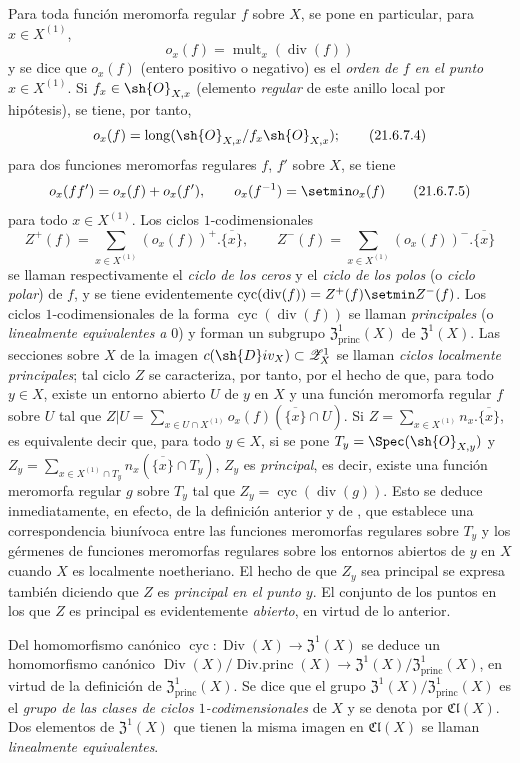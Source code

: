 \begin{env}[21.6.7]
Para toda función meromorfa regular $f$ sobre $X$, se pone en particular, para $x\in X^{(1)}$,
\[
\label{IV.21.6.7.3}
  o_x(f)=\operatorname{mult}_x(\operatorname{div}(f))
  \tag{21.6.7.3}
\]
y se dice que $o_x(f)$ (entero positivo o negativo) es el \emph{orden de $f$ en el punto} $x\in X^{(1)}$.
Si $f_x\in\sh{O}_{X,x}$ (elemento \emph{regular} de este anillo local por hipótesis), se tiene, por tanto,
\[
\label{IV.21.6.7.4}
  o_x(f)=\operatorname{long}(\sh{O}_{X,x}/f_x\sh{O}_{X,x});
  \tag{21.6.7.4}
\]
para dos funciones meromorfas regulares $f$, $f'$ sobre $X$, se tiene
\[
\label{IV.21.6.7.5}
  o_x(ff')=o_x(f)+o_x(f'),\qquad o_x(f^{-1})=\setmin o_x(f)
  \tag{21.6.7.5}
\]
para todo $x\in X^{(1)}$.
Los ciclos $1$-codimensionales
\[
  Z^+(f)=\sum_{x\in X^{(1)}}(o_x(f))^+.\overline{\{x\}},\qquad
  Z^-(f)=\sum_{x\in X^{(1)}}(o_x(f))^-.\overline{\{x\}}
\]
se llaman respectivamente el \emph{ciclo de los ceros} y el \emph{ciclo de los polos} (o \emph{ciclo polar}) de $f$, y se tiene evidentemente $\operatorname{cyc}(\operatorname{div}(f))=Z^+(f)\setmin Z^-(f)$.
Los ciclos $1$-codimensionales de la forma $\operatorname{cyc}(\operatorname{div}(f))$ se llaman \emph{principales} (o \emph{linealmente equivalentes a} $0$) y forman un subgrupo $\mathfrak{Z}^1_\mathrm{princ}(X)$ de $\mathfrak{Z}^1(X)$.
Las secciones sobre $X$ de la imagen $c(\sh{D}iv_X)\subset\mathscr{Z}_X^1$ se
llaman \emph{ciclos localmente principales};
tal ciclo $Z$ se caracteriza, por tanto, por el hecho de que, para todo $y\in X$, existe un entorno abierto $U$ de $y$ en $X$ y una función meromorfa regular $f$ sobre $U$ tal que $Z|U=\sum_{x\in U\cap X^{(1)}}o_x(f)(\overline{\{x\}}\cap U)$.
Si $Z=\sum_{x\in X^{(1)}}n_x.\overline{\{x\}}$, es equivalente decir que, para todo $y\in X$, si se pone $T_y=\Spec(\sh{O}_{X,y})$ y $Z_y=\sum_{x\in X^{(1)}\cap T_y}n_x(\overline{\{x\}}\cap T_y)$, $Z_y$ es \emph{principal}, es decir, existe una función meromorfa regular $g$ sobre $T_y$ tal que $Z_y=\operatorname{cyc}(\operatorname{div}(g))$.
Esto se deduce inmediatamente, en efecto, de la definición anterior y de , que establece una correspondencia biunívoca entre las funciones meromorfas regulares sobre $T_y$ y los gérmenes de funciones meromorfas regulares sobre los entornos abiertos de $y$ en $X$ cuando $X$ es localmente noetheriano.
El hecho de que $Z_y$ sea principal se expresa también diciendo que $Z$ es \emph{principal en el punto $y$}.
El conjunto de los puntos en los que $Z$ es principal es evidentemente \emph{abierto}, en virtud de lo anterior.

Del homomorfismo canónico $\operatorname{cyc}:\operatorname{Div}(X)\to\mathfrak{Z}^1(X)$ se deduce un homomorfismo canónico $\operatorname{Div}(X)/\operatorname{Div.princ}(X)\to\mathfrak{Z}^1(X)/\mathfrak{Z}^1_\mathrm{princ}(X)$, en virtud de la definición de $\mathfrak{Z}^1_\mathrm{princ}(X)$.
Se dice que el grupo $\mathfrak{Z}^1(X)/\mathfrak{Z}^1_\mathrm{princ}(X)$ es el \emph{grupo de las clases de ciclos $1$-codimensionales} de $X$ y se denota por $\mathfrak{Cl}(X)$.
Dos elementos de $\mathfrak{Z}^1(X)$ que tienen la misma imagen en $\mathfrak{Cl}(X)$ se llaman \emph{linealmente equivalentes}.
\end{env}

